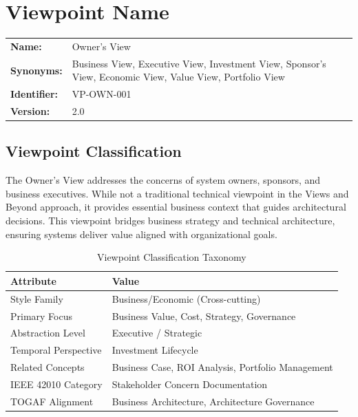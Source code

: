 \documentclass[11pt,letterpaper]{article}
\begin{document}
\section{Viewpoint Name}

\begin{definitionbox}
\begin{tabular}{@{}L{3.5cm}L{10cm}@{}}
\textbf{Name:} & Owner's View \\[0.5em]
\textbf{Synonyms:} & Business View, Executive View, Investment View, Sponsor's View, Economic View, Value View, Portfolio View \\[0.5em]
\textbf{Identifier:} & VP-OWN-001 \\[0.5em]
\textbf{Version:} & 2.0 \\
\end{tabular}
\end{definitionbox}

\subsection{Viewpoint Classification}

The Owner's View addresses the concerns of system owners, sponsors, and business executives. While not a traditional technical viewpoint in the Views and Beyond approach, it provides essential business context that guides architectural decisions. This viewpoint bridges business strategy and technical architecture, ensuring systems deliver value aligned with organizational goals.

\begin{table}[H]
\centering
\caption{Viewpoint Classification Taxonomy}
\begin{tabular}{@{}L{4cm}L{10cm}@{}}
\toprule
\textbf{Attribute} & \textbf{Value} \\
\midrule
Style Family & Business/Economic (Cross-cutting) \\
Primary Focus & Business Value, Cost, Strategy, Governance \\
Abstraction Level & Executive / Strategic \\
Temporal Perspective & Investment Lifecycle \\
Related Concepts & Business Case, ROI Analysis, Portfolio Management \\
IEEE 42010 Category & Stakeholder Concern Documentation \\
TOGAF Alignment & Business Architecture, Architecture Governance \\
\bottomrule
\end{tabular}
\end{table}
\end{document}
